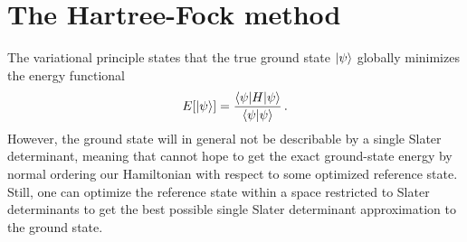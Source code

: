 \section{The Hartree-Fock method}\label{sec:hartree_fock}

The variational principle states that the true ground state $\ket{\psi}$
globally minimizes the energy functional
\begin{equation}
  E[\ket{\psi}] = \frac{\braket{\psi | H | \psi}}{\braket{\psi|\psi}}\,.
\end{equation}
However, the ground state will in general not be describable by a single Slater determinant,
meaning that cannot hope to get the exact ground-state energy
by normal ordering our Hamiltonian with respect to some optimized reference state.
Still, one can optimize the reference state
within a space restricted to Slater determinants
to get the best possible single Slater determinant approximation to the ground state.

